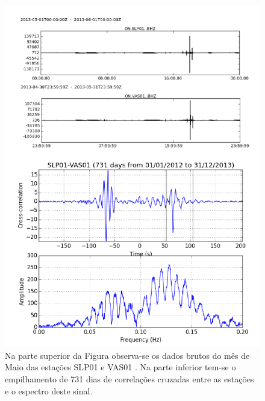 \begin{figure}[!ht]
\centering
\includegraphics[scale=0.5]{Figs/corr_dado_bruto.png}
\caption[Dados Brutos das estações SLP01 e VAS01 e a correlação dos mesmos.]{Na parte superior da Figura observa-se os dados brutos do mês de Maio das estações SLP01 e VAS01 . Na parte inferior tem-se o empilhamento de 731 dias de correlações cruzadas entre as estações e o espectro deste sinal.}
\label{corr_dado_bruto}
\end{figure}

